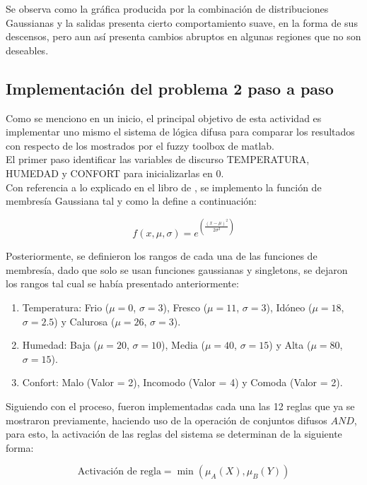 \documentclass[11pt, letterpaper]{article}
\begin{document}
Se observa como la gráfica producida por la combinación de distribuciones Gaussianas y la salidas presenta cierto comportamiento suave, en la forma de sus descensos, pero aun así presenta cambios abruptos en algunas regiones que no son deseables. 

\newpage

\subsection{Implementación del problema 2 paso a paso}

Como se menciono en un inicio, el principal objetivo de esta actividad es implementar uno mismo el sistema de lógica difusa para comparar los resultados con respecto de los mostrados por el fuzzy toolbox de matlab.\\

El primer paso  identificar las variables de discurso TEMPERATURA, HUMEDAD y CONFORT para inicializarlas en 0.\\

Con referencia a lo explicado en el libro de \cite{Cisneros2004}, se implemento la función de membresía Gaussiana tal y como la define a continuación:

\[
f(x, \mu, \sigma) = e^{\left( \frac{(x - \mu)^2}{2\sigma^2} \right)}
\]

Posteriormente, se definieron los rangos de cada una de las funciones de membresía, dado que solo se usan funciones gaussianas y singletons, se dejaron los rangos tal cual se había presentado anteriormente:

\begin{enumerate}
	\item Temperatura: Frio ($\mu = 0$, $\sigma = 3$), Fresco ($\mu = 11$, $\sigma = 3$), Idóneo ($\mu = 18$, $\sigma = 2.5$) y Calurosa ($\mu = 26$, $\sigma = 3$).
	\item Humedad: Baja ($\mu = 20$, $\sigma = 10$), Media ($\mu = 40$, $\sigma = 15$) y Alta ($\mu = 80$, $\sigma = 15$).
	\item Confort: Malo (Valor = 2), Incomodo (Valor = 4) y Comoda (Valor = 2).
\end{enumerate}

Siguiendo con el proceso, fueron implementadas cada una las 12 reglas que ya se mostraron previamente, haciendo uso de la operación de conjuntos difusos $AND$, para esto, la activación de las reglas del sistema se determinan de la siguiente forma:

\[
\text{Activación de regla}  = \min( \mu_A(X), \mu_B(Y) )
\]
\end{document}
